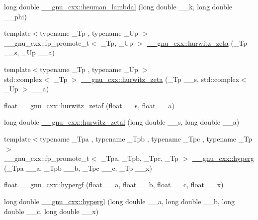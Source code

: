 \begin{DoxyCompactItemize}
\item 
long double \hyperlink{group__gnu__math__spec__func_gadadaeb83b3d9c2fccd33ab8ec3188df5}{\+\_\+\+\_\+gnu\+\_\+cxx\+::heuman\+\_\+lambdal} (long double \+\_\+\+\_\+k, long double \+\_\+\+\_\+phi)
\item 
{\footnotesize template$<$typename \+\_\+\+Tp , typename \+\_\+\+Up $>$ }\\\+\_\+\+\_\+gnu\+\_\+cxx\+::fp\+\_\+promote\+\_\+t$<$ \+\_\+\+Tp, \+\_\+\+Up $>$ \hyperlink{group__gnu__math__spec__func_ga7b167ce1c8d9aa6aad40fc83a95733bd}{\+\_\+\+\_\+gnu\+\_\+cxx\+::hurwitz\+\_\+zeta} (\+\_\+\+Tp \+\_\+\+\_\+s, \+\_\+\+Up \+\_\+\+\_\+a)
\item 
{\footnotesize template$<$typename \+\_\+\+Tp , typename \+\_\+\+Up $>$ }\\std\+::complex$<$ \+\_\+\+Tp $>$ \hyperlink{group__gnu__math__spec__func_gaa7f0d1fbba9d2ce07a30d907302d527f}{\+\_\+\+\_\+gnu\+\_\+cxx\+::hurwitz\+\_\+zeta} (\+\_\+\+Tp \+\_\+\+\_\+s, std\+::complex$<$ \+\_\+\+Up $>$ \+\_\+\+\_\+a)
\item 
float \hyperlink{group__gnu__math__spec__func_gaa745d7f2edde060ed2f22817ad89df1f}{\+\_\+\+\_\+gnu\+\_\+cxx\+::hurwitz\+\_\+zetaf} (float \+\_\+\+\_\+s, float \+\_\+\+\_\+a)
\item 
long double \hyperlink{group__gnu__math__spec__func_gad8f2cfc7e198755968bae35d46b49d5a}{\+\_\+\+\_\+gnu\+\_\+cxx\+::hurwitz\+\_\+zetal} (long double \+\_\+\+\_\+s, long double \+\_\+\+\_\+a)
\item 
{\footnotesize template$<$typename \+\_\+\+Tpa , typename \+\_\+\+Tpb , typename \+\_\+\+Tpc , typename \+\_\+\+Tp $>$ }\\\+\_\+\+\_\+gnu\+\_\+cxx\+::fp\+\_\+promote\+\_\+t$<$ \+\_\+\+Tpa, \+\_\+\+Tpb, \+\_\+\+Tpc, \+\_\+\+Tp $>$ \hyperlink{group__gnu__math__spec__func_ga374198e4076f9e23f3878ca3af70e6da}{\+\_\+\+\_\+gnu\+\_\+cxx\+::hyperg} (\+\_\+\+Tpa \+\_\+\+\_\+a, \+\_\+\+Tpb \+\_\+\+\_\+b, \+\_\+\+Tpc \+\_\+\+\_\+c, \+\_\+\+Tp \+\_\+\+\_\+x)
\item 
float \hyperlink{group__gnu__math__spec__func_gac4c81e4ea9cef149fe40291ca10d7e15}{\+\_\+\+\_\+gnu\+\_\+cxx\+::hypergf} (float \+\_\+\+\_\+a, float \+\_\+\+\_\+b, float \+\_\+\+\_\+c, float \+\_\+\+\_\+x)
\item 
long double \hyperlink{group__gnu__math__spec__func_ga9961967087216e97f76283f29e1be152}{\+\_\+\+\_\+gnu\+\_\+cxx\+::hypergl} (long double \+\_\+\+\_\+a, long double \+\_\+\+\_\+b, long double \+\_\+\+\_\+c, long double \+\_\+\+\_\+x)
\item 

\end{DoxyCompactItemize}
